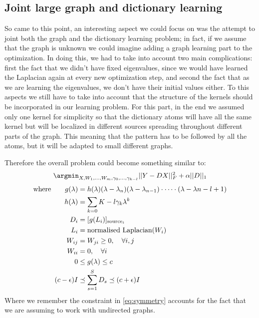 \subsection{Joint large graph and dictionary learning}
So came to this point, an interesting aspect we could focus on was the attempt to joint both the graph and the dictionary learning problem; in fact, if we assume that the graph is unknown we could imagine adding a graph learning part to the optimization. In doing this, we had to take into account two main complications: first the fact that we didn't have fixed eigenvalues, since we would have learned the Laplacian again at every new optimization step, and second the fact that as we are learning the eigenvalues, we don't have their initial values either. To this aspects we still have to take into account that the structure of the kernels should be incorporated in our learning problem. For this part, in the end we assumed only one kernel for simplicity so that the dictionary atoms will have all the same kernel but will be localized in different sources spreading throughout different parts of the graph. This meaning that the pattern has to be followed by all the atoms, but it will be adapted to small different graphs.

Therefore the overall problem could become something similar to:
\begin{equation}
\argmin_{X,W_1,\dots,W_m,\gamma_0,\dots,\gamma_{k-l}} ||Y - DX||^2_F + \alpha||D||_1
\label{eq:overallProblem}
\end{equation}
\begin{align}
\text{where} \qquad g(\lambda) &= h(\lambda)(\lambda - \lambda_n)(\lambda - \lambda_{n-1})\cdot \dots \cdot (\lambda - \lambda{n-l+1}) \notag\\
h(\lambda) &= \sum_{k=0}{K-l}\gamma_k\lambda^{k} \notag\\
D_i &= [g(L_i)]_{\text{source}_i} \notag\\
L_i &= \text{normalised Laplacian}(W_i) \notag\\
W_{ij} &= W_{ji} \geq 0, \quad \forall i,j \label{eq:symmetry}\\
W_{ii} &= 0, \quad \forall i \notag\\
0 &\leq g(\lambda) \leq c \\
(c-\epsilon)I &\preceq \sum_{s=1}^{S}D_s \preceq (c+\epsilon)I
\end{align}
Where we remember the constraint in \ref{eq:symmetry} accounts for the fact that we are assuming to work with undirected graphs.\\


